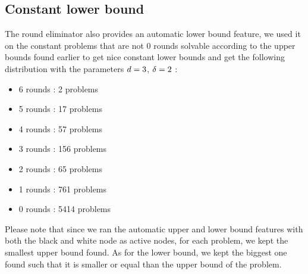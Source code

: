 \subsection{Constant lower bound}
The round eliminator \cite{round-eliminator} also provides an automatic lower bound feature, we used it on the constant problems that are not 0 rounds solvable according to the upper bounds found earlier to get nice constant lower bounds and get the following distribution with the parameters $d = 3$, $\delta = 2$ :
\begin{itemize}
    \item 6 rounds : 2 problems
    \item 5 rounds : 17 problems
    \item 4 rounds : 57 problems
    \item 3 rounds : 156 problems
    \item 2 rounds : 65 problems
    \item 1 rounds : 761 problems
    \item 0 rounds : 5414 problems
\end{itemize}

Please note that since we ran the automatic upper and lower bound features with both the black and white node as active nodes, for each problem, we kept the smallest upper bound found. As for the lower bound, we kept the biggest one found such that it is smaller or equal than the upper bound of the problem.